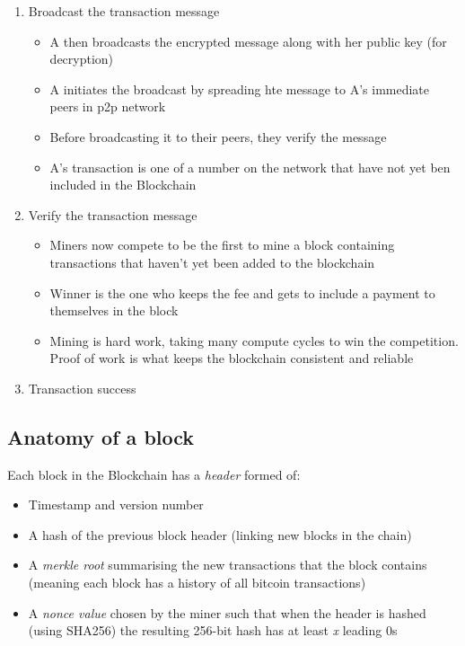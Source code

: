 \documentclass[11pt,a4paper,titlepage,dvipsnames,cmyk]{scrartcl}
\begin{document}
\begin{enumerate}
\begin{itemize}
\end{itemize}
\item Broadcast the transaction message
\begin{itemize}
    \item A then broadcasts the encrypted message along with her public key (for decryption)
    \item A initiates the broadcast by spreading hte message to A's immediate peers in p2p network
    \item Before broadcasting it to their peers, they verify the message
    \item A's transaction is one of a number on the network that have not yet ben included in the Blockchain
\end{itemize}
\item Verify the transaction message
\begin{itemize}
    \item Miners now compete to be the first to mine a block containing transactions that haven't yet been added to the blockchain
    \item Winner is the one who keeps the fee and gets to include a payment to themselves in the block
    \item Mining is hard work, taking many compute cycles to win the competition. Proof of work is what keeps the blockchain consistent and reliable
\end{itemize}
\item Transaction success
\end{enumerate}

\subsection{Anatomy of a block}
Each block in the Blockchain has a \textit{header} formed of:
\begin{itemize}
    \item Timestamp and version number
    \item A hash of the previous block header (linking new blocks in the chain)
    \item A \textit{merkle root} summarising the new transactions that the block contains (meaning each block has a history of all bitcoin transactions)
    \item A \textit{nonce value} chosen by the miner such that when the header is hashed (using SHA256) the resulting 256-bit hash has at least \textit{x} leading 0s
\end{itemize}
\end{document}
